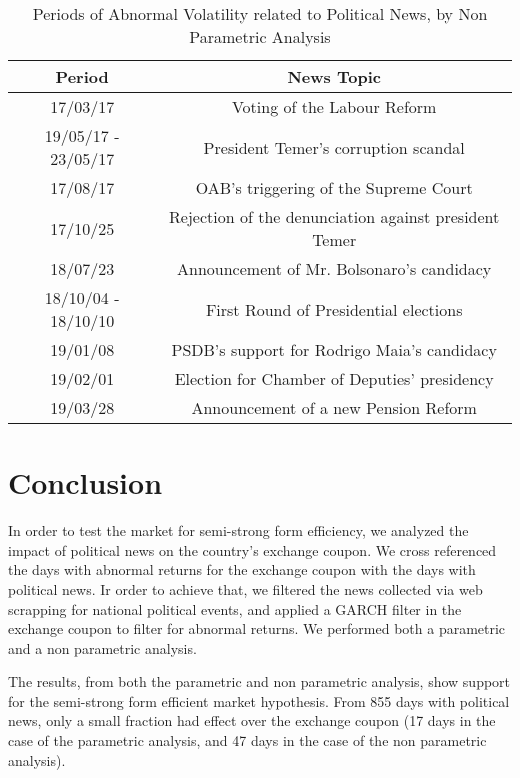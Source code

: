 \documentclass[cic,tc, english]{iiufrgs}
\begin{document}
    \begin{table}[H]
        \caption{Periods of Abnormal Volatility related to Political News, by Non Parametric Analysis}
        \label{tab:resnon}
        \centering
        \begin{tabular}{| c | c |}
            \hline
            Period & News Topic \\
            \hline \hline
            17/03/17 & Voting of the Labour Reform \\
            \hline
            19/05/17 - 23/05/17 & President Temer's corruption scandal \\
            \hline
            17/08/17 & OAB's triggering of the Supreme Court \\
            \hline
            17/10/25 & Rejection of the denunciation against president Temer \\
            \hline
            18/07/23 & Announcement of Mr. Bolsonaro's candidacy \\
            \hline
            18/10/04 - 18/10/10 & First Round of Presidential elections \\
            \hline
            19/01/08 & PSDB's support for Rodrigo Maia's candidacy \\
            \hline
            19/02/01 & Election for Chamber of Deputies' presidency \\
            \hline
            19/03/28 & Announcement of a new Pension Reform \\
            \hline
        \end{tabular}
    \end{table}

\chapter{Conclusion} \label{chapter_conclusion}

    In order to test the market for semi-strong form efficiency, we analyzed the impact of political news on the country's exchange coupon. We cross referenced the days with abnormal returns for the exchange coupon with the days with political news. Ir order to achieve that, we filtered the news collected via web scrapping for national political events, and applied a GARCH filter in the exchange coupon to filter for abnormal returns. We performed both a parametric and a non parametric analysis.

    The results, from both the parametric and non parametric analysis, show support for the semi-strong form efficient market hypothesis. From 855 days with political news, only a small fraction had effect over the exchange coupon (17 days in the case of the parametric analysis, and 47 days in the case of the non parametric analysis).
\end{document}

